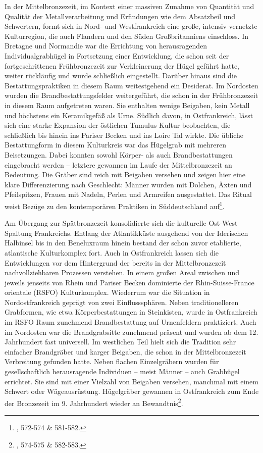 \documentclass[openany,twoside,twocolumn]{book}
\let\rmarkdownfootnote\footnote%
\def\footnote{\protect\rmarkdownfootnote}
\begin{document}
In der Mittelbronzezeit, im Kontext einer massiven Zunahme von Quantität
und Qualität der Metallverarbeitung und Erfindungen wie dem Absatzbeil
und Schwertern, formt sich in Nord- und Westfrankreich eine große,
intensiv vernetzte Kulturregion, die auch Flandern und den Süden
Großbritanniens einschloss. In Bretagne und Normandie war die Errichtung
von herausragenden Individualgrabhügel in Fortsetzung einer Entwicklung,
die schon seit der fortgeschrittenen Frühbronzezeit zur Verkleinerung
der Hügel geführt hatte, weiter rückläufig und wurde schließlich
eingestellt. Darüber hinaus sind die Bestattungspraktiken in diesem Raum
weitestgehend ein Desiderat. Im Nordosten wurden die
Brandbestattungsfelder weitergeführt, die schon in der Frühbronzezeit in
diesem Raum aufgetreten waren. Sie enthalten wenige Beigaben, kein
Metall und höchstens ein Keramikgefäß als Urne. Südlich davon, in
Ostfrankreich, lässt sich eine starke Expansion der östlichen Tumulus
Kultur beobachten, die schließlich bis hinein ins Pariser Becken und ins
Loire Tal wirkte. Die übliche Bestattungform in diesem Kulturkreis war
das Hügelgrab mit mehreren Beisetzungen. Dabei konnten sowohl Körper-
als auch Brandbestattungen eingebracht werden -- letztere gewannen im
Laufe der Mittelbronzezeit an Bedeutung. Die Gräber sind reich mit
Beigaben versehen und zeigen hier eine klare Differenzierung nach
Geschlecht: Männer wurden mit Dolchen, Äxten und Pfeilspitzen, Frauen
mit Nadeln, Perlen und Armreifen ausgestattet. Das Ritual weist Bezüge
zu den kontemporären Praktiken in Süddeutschland auf\footnote{\textcite{mordant_bronze_2013},
  572-574 \& 581-582.}.

Am Übergang zur Spätbronzezeit konsolidierte sich die kulturelle
Ost-West Spaltung Frankreichs. Entlang der Atlantikküste ausgehend von
der Iderischen Halbinsel bis in den Beneluxraum hinein bestand der schon
zuvor etablierte, atlantische Kulturkomplex fort. Auch in Ostfrankreich
lassen sich die Entwicklungen vor dem Hintergrund der bereits in der
Mittelbronzezeit nachvollziehbaren Prozessen verstehen. In einem großen
Areal zwischen und jeweils jenseits von Rhein und Pariser Becken
dominierte der Rhin-Suisse-France orientale (RSFO) Kulturkomplex.
Wiederrum war die Situation in Nordostfrankreich geprägt von zwei
Einflusssphären. Neben traditionelleren Grabformen, wie etwa
Körperbestattungen in Steinkisten, wurde in Ostfrankreich im RSFO Raum
zunehmend Brandbestattung auf Urnenfeldern praktiziert. Auch im
Nordosten war die Brandgrabsitte zunehmend präsent und wurden ab dem 12.
Jahrhundert fast universell. Im westlichen Teil hielt sich die Tradition
sehr einfacher Brandgräber und karger Beigaben, die schon in der
Mittelbronzezeit Verbreitung gefunden hatte. Neben flachen Einzelgräbern
wurden für gesellschaftlich herausragende Individuen -- meist Männer --
auch Grabhügel errichtet. Sie sind mit einer Vielzahl von Beigaben
versehen, manchmal mit einem Schwert oder Wägeausrüstung. Hügelgräber
gewannen in Ostfrankreich zum Ende der Bronzezeit im 9. Jahrhundert
wieder an Bewandtnis\footnote{\textcite{mordant_bronze_2013}, 574-575 \&
  582-583.}.
\end{document}
